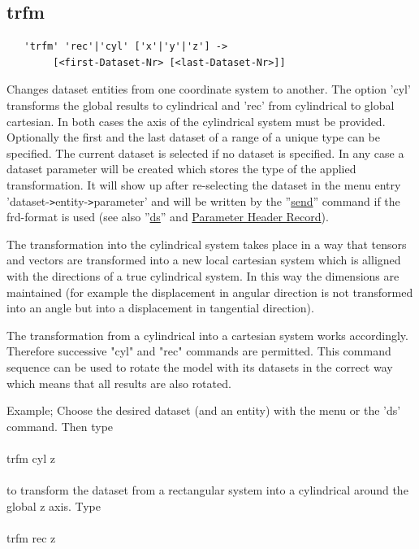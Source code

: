 \documentclass{article}
\providecommand{\htmlref}[2]{\hyperref[#2]{#1}}
\begin{document}
\subsection{\label{trfm}trfm}
\begin{verbatim}
   'trfm' 'rec'|'cyl' ['x'|'y'|'z'] ->
        [<first-Dataset-Nr> [<last-Dataset-Nr>]]
\end{verbatim}
Changes dataset entities from one coordinate system to another. The option
'cyl' transforms the global results to cylindrical and 'rec' from cylindrical
to global cartesian. In both cases the axis of the cylindrical system must be
provided. Optionally the first and the last dataset of a range of a unique
type can be specified. The current dataset is selected if no dataset is
specified. In any case a dataset parameter will be created which stores the type of the applied transformation. It will show up after re-selecting the dataset in the menu entry 'dataset-\verb_>_entity-\verb_>_parameter' and will be written by the ''\htmlref{send}{send}'' command if the frd-format is used (see also ''\htmlref{ds}{ds}'' and \htmlref{Parameter Header Record}{Parameter Header Record}).

The transformation into the cylindrical system takes place in a way that tensors and vectors are transformed into a new local cartesian system which is alligned with the directions of a true cylindrical system. In this way the dimensions are maintained (for example the displacement in angular direction is not transformed into an angle but into a displacement in tangential direction).

The transformation from a cylindrical into a cartesian system works accordingly. Therefore successive "cyl" and "rec" commands are permitted. This command sequence can be used to rotate the model with its datasets in the correct way which means that all results are also rotated.

Example; Choose the desired dataset (and an entity) with the menu or the 'ds' command. Then type\\\\

trfm cyl z\\\\

to transform the dataset from a rectangular system into a cylindrical around the global z axis. Type\\\\

trfm rec z\\\\
\end{document}
